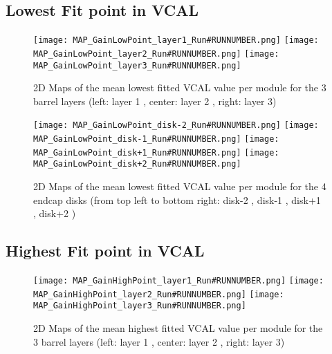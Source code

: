 \documentclass[a4paper,10pt]{article}
\begin{document}
\pagebreak





\subsection{Lowest Fit point in VCAL}

\begin{figure}[htp]
 \centering
\subfigure
 {\texttt{[image: MAP\_GainLowPoint\_layer1\_Run\#RUNNUMBER.png]}}
\subfigure
 {\texttt{[image: MAP\_GainLowPoint\_layer2\_Run\#RUNNUMBER.png]}}
\subfigure
 {\texttt{[image: MAP\_GainLowPoint\_layer3\_Run\#RUNNUMBER.png]}}
\caption{2D Maps of the mean lowest fitted VCAL value per module for the 3 barrel layers (left: layer 1 , center: layer 2 , right: layer 3)}
\end{figure}

\begin{figure}[htp]
 \centering
\subfigure
 {\texttt{[image: MAP\_GainLowPoint\_disk-2\_Run\#RUNNUMBER.png]}}
\subfigure
 {\texttt{[image: MAP\_GainLowPoint\_disk-1\_Run\#RUNNUMBER.png]}}
\subfigure
 {\texttt{[image: MAP\_GainLowPoint\_disk+1\_Run\#RUNNUMBER.png]}}
\subfigure
 {\texttt{[image: MAP\_GainLowPoint\_disk+2\_Run\#RUNNUMBER.png]}}
\caption{2D Maps of the mean lowest fitted VCAL value per module for the 4 endcap disks (from top left to bottom right: disk-2 , disk-1 , disk+1 , disk+2 )}
\end{figure}


\pagebreak





\subsection{Highest Fit point in VCAL}

\begin{figure}[htp]
 \centering
\subfigure
 {\texttt{[image: MAP\_GainHighPoint\_layer1\_Run\#RUNNUMBER.png]}}
\subfigure
 {\texttt{[image: MAP\_GainHighPoint\_layer2\_Run\#RUNNUMBER.png]}}
\subfigure
 {\texttt{[image: MAP\_GainHighPoint\_layer3\_Run\#RUNNUMBER.png]}}
\caption{2D Maps of the mean highest fitted VCAL value per module for the 3 barrel layers (left: layer 1 , center: layer 2 , right: layer 3)}
\end{figure}
\end{document}
